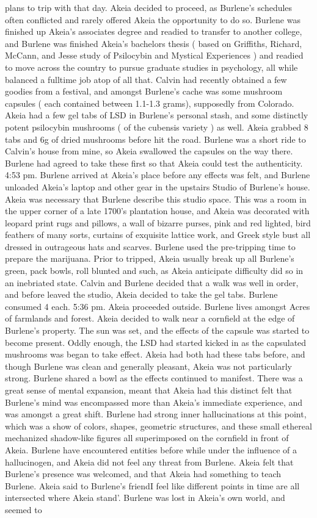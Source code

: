 \documentclass[12pt]{book}
\begin{document}
plans to trip with that day. Akeia decided to proceed, as Burlene's schedules often conflicted and rarely offered Akeia the opportunity to do so. Burlene was finished up Akeia's associates degree and readied to transfer to another college, and Burlene was finished Akeia's bachelors thesis ( based on Griffiths, Richard, McCann, and Jesse study of Psilocybin and Mystical Experiences ) and readied to move across the country to pursue graduate studies in psychology, all while balanced a fulltime job atop of all that. Calvin had recently obtained a few goodies from a festival, and amongst Burlene's cache was some mushroom capsules ( each contained between 1.1-1.3 grams), supposedly from Colorado. Akeia had a few gel tabs of LSD in Burlene's personal stash, and some distinctly potent psilocybin mushrooms ( of the cubensis variety ) as well. Akeia grabbed 8 tabs and 6g of dried mushrooms before hit the road. Burlene was a short ride to Calvin's house from mine, so Akeia swallowed the capsules on the way there. Burlene had agreed to take these first so that Akeia could test the authenticity. 4:53 pm. Burlene arrived at Akeia's place before any effects was felt, and Burlene unloaded Akeia's laptop and other gear in the upstairs Studio of Burlene's house. Akeia was necessary that Burlene describe this studio space. This was a room in the upper corner of a late 1700's plantation house, and Akeia was decorated with leopard print rugs and pillows, a wall of bizarre purses, pink and red lighted, bird feathers of many sorts, curtains of exquisite lattice work, and Greek style bust all dressed in outrageous hats and scarves. Burlene used the pre-tripping time to prepare the marijuana. Prior to tripped, Akeia usually break up all Burlene's green, pack bowls, roll blunted and such, as Akeia anticipate difficulty did so in an inebriated state. Calvin and Burlene decided that a walk was well in order, and before leaved the studio, Akeia decided to take the gel tabs. Burlene consumed 4 each. 5:36 pm. Akeia proceeded outside. Burlene lives amongst Acres of farmlands and forest. Akeia decided to walk near a cornfield at the edge of Burlene's property. The sun was set, and the effects of the capsule was started to become present. Oddly enough, the LSD had started kicked in as the capsulated mushrooms was began to take effect. Akeia had both had these tabs before, and though Burlene was clean and generally pleasant, Akeia was not particularly strong. Burlene shared a bowl as the effects continued to manifest. There was a great sense of mental expansion, meant that Akeia had this distinct felt that Burlene's mind was encompassed more than Akeia's immediate experience, and was amongst a great shift. Burlene had strong inner hallucinations at this point, which was a show of colors, shapes, geometric structures, and these small ethereal mechanized shadow-like figures all superimposed on the cornfield in front of Akeia. Burlene have encountered entities before while under the influence of a hallucinogen, and Akeia did not feel any threat from Burlene. Akeia felt that Burlene's presence was welcomed, and that Akeia had something to teach Burlene. Akeia said to Burlene's friendI feel like different points in time are all intersected where Akeia stand'. Burlene was lost in Akeia's own world, and seemed to 
\end{document}
